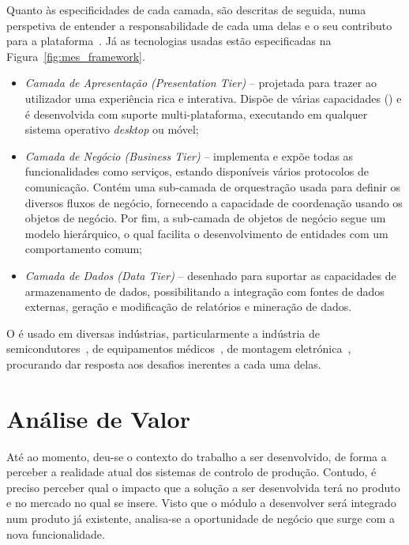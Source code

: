 Quanto às especificidades de cada camada, são descritas de seguida, numa perspetiva de entender a responsabilidade de cada uma delas e o seu contributo para a plataforma~\parencite{cmf_mes_framework}. Já as tecnologias usadas estão especificadas na Figura~\ref{fig:mes_framework}.

\begin{itemize}
    \item 
    {
        \textit{Camada de Apresentação (Presentation Tier)} -- projetada para trazer ao utilizador uma experiência rica e interativa. Dispõe de várias capacidades () e é desenvolvida com suporte multi-plataforma, executando em qualquer sistema operativo \textit{desktop} ou móvel;
    }
    \item
    {
        \textit{Camada de Negócio (Business Tier)} -- implementa e expõe todas as funcionalidades como serviços, estando disponíveis vários protocolos de comunicação. Contém uma sub-camada de orquestração usada para definir os diversos fluxos de negócio, fornecendo a capacidade de coordenação usando os objetos de negócio. Por fim, a sub-camada de objetos de negócio segue um modelo hierárquico, o qual facilita o desenvolvimento de entidades com um comportamento comum;
    }
    \item
    {
        \textit{Camada de Dados (Data Tier)} -- desenhado para suportar as capacidades de armazenamento de dados, possibilitando a integração com fontes de dados externas, geração e modificação de relatórios e mineração de dados.
    }
\end{itemize}

O {\productname} é usado em diversas indústrias, particularmente a indústria de semicondutores~\parencite{cmf_industries_semiconductor}, de equipamentos médicos~\parencite{cmf_industries_medical_devices}, de montagem eletrónica~\parencite{cmf_industries_electronics}, procurando dar resposta aos desafios inerentes a cada uma delas.

\section{Análise de Valor}
\label{sec:chap02_valueanalysis}
Até ao momento, deu-se o contexto do trabalho a ser desenvolvido, de forma a perceber a realidade atual dos sistemas de controlo de produção. Contudo, é preciso perceber qual o impacto que a solução a ser desenvolvida terá no produto e no mercado no qual se insere. Visto que o módulo a desenvolver será integrado num produto já existente, analisa-se a oportunidade de negócio que surge com a nova funcionalidade.

